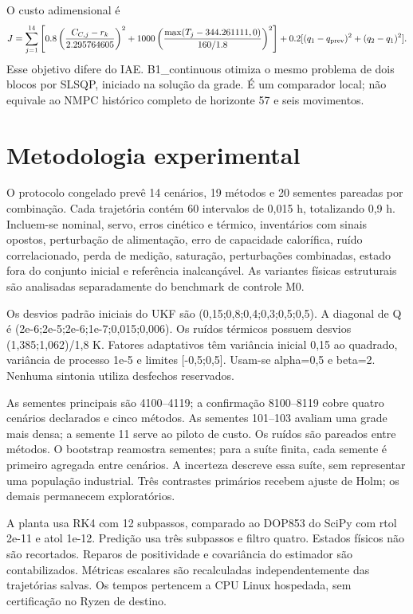 \documentclass[
  11pt,
]{article}
\begin{document}
O custo adimensional é
\[J=\sum_{j=1}^{14}\left[0.8\left(\frac{C_{C,j}-r_k}{2.295764605}\right)^2+
1000\left(\frac{\max(T_j-344.261111,0)}{160/1.8}\right)^2\right]
+0.2[(q_1-q_{\rm prev})^2+(q_2-q_1)^2].\] Esse objetivo difere do IAE.
B1\_continuous otimiza o mesmo problema de dois blocos por SLSQP,
iniciado na solução da grade. É um comparador local; não equivale ao
NMPC histórico completo de horizonte 57 e seis movimentos.

\hypertarget{metodologia-experimental}{%
\section{Metodologia experimental}\label{metodologia-experimental}}

O protocolo congelado prevê 14 cenários, 19 métodos e 20 sementes
pareadas por combinação. Cada trajetória contém 60 intervalos de 0,015
h, totalizando 0,9 h. Incluem-se nominal, servo, erros cinético e
térmico, inventários com sinais opostos, perturbação de alimentação,
erro de capacidade calorífica, ruído correlacionado, perda de medição,
saturação, perturbações combinadas, estado fora do conjunto inicial e
referência inalcançável. As variantes físicas estruturais são analisadas
separadamente do benchmark de controle M0.

Os desvios padrão iniciais do UKF são (0,15;0,8;0,4;0,3;0,5;0,5). A
diagonal de Q é (2e-6;2e-5;2e-6;1e-7;0,015;0,006). Os ruídos térmicos
possuem desvios (1,385;1,062)/1,8 K. Fatores adaptativos têm variância
inicial 0,15 ao quadrado, variância de processo 1e-5 e limites
{[}-0,5;0,5{]}. Usam-se alpha=0,5 e beta=2. Nenhuma sintonia utiliza
desfechos reservados.

As sementes principais são 4100--4119; a confirmação 8100--8119 cobre
quatro cenários declarados e cinco métodos. As sementes 101--103 avaliam
uma grade mais densa; a semente 11 serve ao piloto de custo. Os ruídos
são pareados entre métodos. O bootstrap reamostra sementes; para a suíte
finita, cada semente é primeiro agregada entre cenários. A incerteza
descreve essa suíte, sem representar uma população industrial. Três
contrastes primários recebem ajuste de Holm; os demais permanecem
exploratórios.

A planta usa RK4 com 12 subpassos, comparado ao DOP853 do SciPy com rtol
2e-11 e atol 1e-12. Predição usa três subpassos e filtro quatro. Estados
físicos não são recortados. Reparos de positividade e covariância do
estimador são contabilizados. Métricas escalares são recalculadas
independentemente das trajetórias salvas. Os tempos pertencem a CPU
Linux hospedada, sem certificação no Ryzen de destino.
\end{document}
